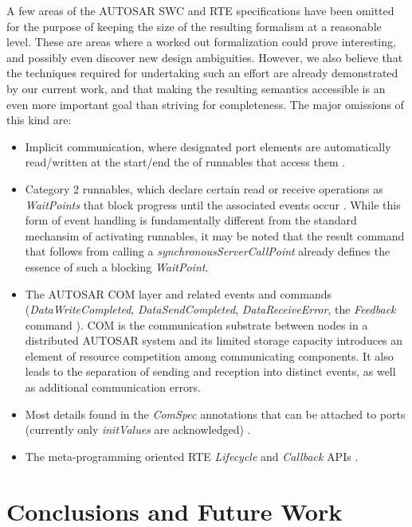 \documentclass[10pt,conference]{IEEEtran}
\begin{document}
A few areas of the AUTOSAR SWC and RTE specifications have been omitted for the purpose of keeping the size of the resulting formalism at a reasonable level. These are areas where a worked out formalization could prove interesting, and possibly even discover new design ambiguities. However, we also believe that the techniques required for undertaking such an effort are already demonstrated by our current work, and that making the resulting semantics accessible is an even more important goal than striving for completeness. The major omissions of this kind are:
\begin{itemize}
\item Implicit communication, where designated port elements are automatically read/written at the start/end the of runnables that access them \cite[ch.~4.3.1.5]{AR:RTE}.
\item Category 2 runnables, which declare certain read or receive operations as \emph{WaitPoints} that block progress until the associated events occur \cite[ch.~7.2.4.4]{AR:SWC}. While this form of event handling is fundamentally different from the standard mechansim of activating runnables, it may be noted that the result command that follows from calling a \emph{synchronousServerCallPoint} already defines the essence of such a blocking \emph{WaitPoint}.
\item The AUTOSAR COM layer \cite{AR:COM} and related events and commands (\emph{DataWriteCompleted}, \emph{DataSendCompleted}, \emph{DataReceiveError}, the {\em Feedback} command \cite[ch.~5.7.5, 5.6.8]{AR:RTE}). COM is the communication substrate between nodes in a distributed AUTOSAR system and its limited storage capacity introduces an element of resource competition among communicating components. It also leads to the separation of sending and reception into distinct events, as well as additional communication errors.
\item Most details found in the \emph{ComSpec} annotations that can be attached to ports (currently only \emph{initValues} are acknowledged) \cite[ch.~4.5]{AR:SWC}.
\item The meta-programming oriented RTE {\em Lifecycle} and {\em Callback} APIs \cite[ch.~5.8-9]{AR:RTE}.
\end{itemize}


\section{Conclusions and Future Work}
\label{sec:Conc}
\end{document}
